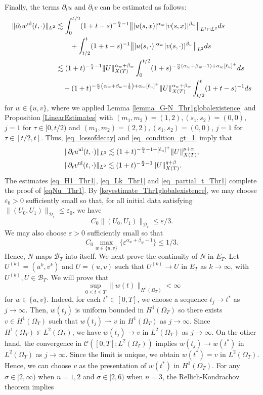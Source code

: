 \documentclass[11pt,reqno]{amsart}
\newcommand{\ity}{\infty}
\newcommand{\tron}[1]{\left(#1\right)}
\begin{document}
	Finally, the terms $\partial_tu$ and $\partial_tv$ can be estimated as follows:
	\begin{align*}
		\|\partial_tw^{\rm nl}(t,\cdot)\|_{L^2} &\lesssim \int_0^{t/2} (1+t-s)^{-\frac{n}{4}-1} \big\||u(s,x)|^{\alpha_w}|v(s,x)|^{\beta_w}\big\|_{L^1\cap L^2} ds\\
		&\qquad+\int_{t/2}^t (1+t-s)^{-1}\big\||u(s,\cdot)|^{\alpha_w}|v(s,\cdot)|^{\beta_w}\big\|_{L^{2}} ds\\
		&\lesssim (1+t)^{-\frac{n}{4}-1} \|U\|_{X(T)}^{\alpha_w+\beta_w} \int_0^{t/2}(1+s)^{-\frac{n}{2}\tron{\alpha_w+\beta_w-1}+\alpha_w[\ell_u]^+}ds\\
		&\quad+ (1+t)^{-\frac{n}{2}\tron{\alpha_w+\beta_w-\frac{1}{2}}+\alpha_w[\ell_u]^+} \|U\|_{X(T)}^{\alpha_w+\beta_w}\int_{t/2}^t (1+t-s)^{-1}ds
	\end{align*}
	for $w\in\{u,v\}$, where we applied Lemma \ref{lemma_G-N_Thr1globalexistence} and Proposition \ref{LinearEstimates} with $(m_1,m_2) =(1,2), (s_1, s_2) = (0,0)$, $j=1$ for $\tau \in [0, t/2)$ and $(m_1,m_2)=(2,2), (s_1, s_2) = (0,0)$, $j=1$ for $\tau \in [t/2, t]$. Thus, \eqref{eq_lossofdecay} and \eqref{eq_condition_gt_1} imply that
	\begin{equation}\label{eq_partial_t_Thr1}
		\begin{aligned}
			&\|\partial_t u^{\rm nl}(t,\cdot)\|_{L^2}\lesssim (1+t)^{-\frac{n}{4}-1+[\ell_u]^+} \|U\|_{X(T)}^{p+\alpha},\\
			&\|\partial_t v^{\rm nl}(t,\cdot)\|_{L^2}\lesssim (1+t)^{-\frac{n}{4}-1}\|U\|_{X(T)}^{q+\beta}.
		\end{aligned}
	\end{equation}
	The estimates \eqref{eq_H1_Thr1}, \eqref{eq_Lk_Thr1} and \eqref{eq_partial_t_Thr1} complete the proof of \eqref{eqNu_Thr1}.
	\noindent By \eqref{keyestimate_Thr1globalexistence}, we may choose $\varepsilon_0>0$ sufficiently small so that, for all initial data satisfying $ \|(U_0,U_1)\|_{\mathcal{D}_{r}}\leq \varepsilon_0$, we have
	\[
	C_0\|(U_0,U_1)\|_{\mathcal{D}_{r}}\leq \varepsilon/3.
	\]
	We may also choose $\varepsilon>0$ sufficiently small so that 
	\[
	C_0\max_{w\in\{u,v\}}\{\varepsilon^{\alpha_w+\beta_w-1}\}\leq 1/3.
	\]
	Hence, $N$ maps $\mathcal{B}_T$ into itself. We next prove the continuity of $N$ in $E_T$. Let $U^{(k)}=(u^k,v^k)$ and $U=(u,v)$ such that $U^{(k)}\to U$ in $E_T$ as $k\to\ity$, with $U^{(k)},U\in\mathcal{B}_T$. We will prove that
	\[
	\sup_{0\leq t\leq T}\|w(t)\|_{\dot{H^1(\Omega_T)}}<\infty
	\]
	for $w\in \{u,v\}$. Indeed, for each $t^*\in [0,T]$, we choose a sequence $t_j\to t^*$ as $j\to \ity$. Then, $w(t_j)$ is uniform bounded in $H^1(\Omega_T)$ so there exists $v\in H^1(\Omega_T)$ such that $w(t_j){\rightharpoonup} v\text{ in }H^1(\Omega_T)$ as $j\to \ity$. Since $H^1(\Omega_T)\Subset L^2(\Omega_T)$, we have $w(t_j)\to v\text{ in }L^2(\Omega_T)$ as $j\to \ity$. On the other hand, the convergence in $\mathcal{C}([0,T];L^2(\Omega_T))$ implies $w(t_j)\to w(t^*)$ in $L^2(\Omega_T)$ as $j\to \ity$. Since the limit is unique, we obtain $w(t^*)=v$ in $L^2(\Omega_T)$. Hence, we can choose $v$ as the presentation of $w(t^*)$ in $H^1(\Omega_T)$. For any $\sigma\in [2,\infty)$ when $n=1,2$ and $\sigma \in [2,6)$ when $n=3$, the Rellich-Kondrachov theorem implies
\end{document}
